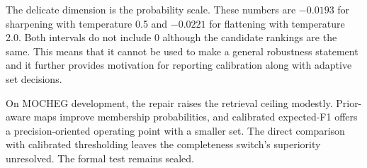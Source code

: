 The delicate dimension is the probability scale. These numbers are $-0.0193$ for sharpening with temperature 0.5 and $-0.0221$ for flattening with temperature 2.0. Both intervals do not include 0 although the candidate rankings are the same. This means that it cannot be used to make a general robustness statement and it further provides motivation for reporting calibration along with adaptive set decisions.

On MOCHEG development, the repair raises the retrieval ceiling modestly. Prior-aware maps improve membership probabilities, and calibrated expected-F1 offers a precision-oriented operating point with a smaller set. The direct comparison with calibrated thresholding leaves the completeness switch's superiority unresolved. The formal test remains sealed.
